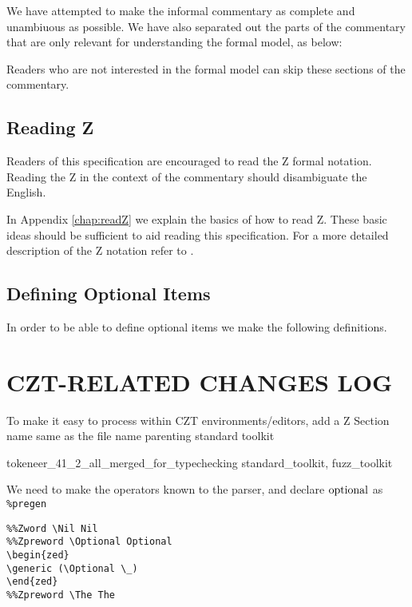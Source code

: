 We have attempted to make the informal commentary as complete and
unambiuous as possible. We have also separated out the parts of the
commentary that are only relevant for understanding the formal model,
as below:
\begin{Zcomment}
\item
Readers who are not interested in the formal model can skip these
sections of the commentary.
\end{Zcomment}

\subsection{Reading Z}
Readers of this specification are encouraged to read the Z formal notation. 
Reading the Z in the context of the commentary should disambiguate the
English. 

In Appendix \ref{chap:readZ} we explain the basics of how to read Z. 
These basic ideas should be sufficient to aid reading this
specification. For a more detailed description of the Z notation refer
to \cite{Spivey}.

\subsection{Defining Optional Items}

In order to be able to define optional items we make the following definitions.

\def\Nil{nil}%
\def\Optional{\mathop{\rm optional}}
\def\The{the~}%


\section{CZT-RELATED CHANGES LOG}

To make it easy to process within CZT environments/editors, add a Z Section name
same as the file name parenting standard toolkit
%
\begin{zsection}
  \SECTION tokeneer\_41\_2\_all\_merged\_for\_typechecking \parents standard\_toolkit, fuzz\_toolkit
\end{zsection}

We need to make the operators known to the parser, and declare $\Optional$ as \verb'%pregen'
\begin{verbatim}
%%Zword \Nil Nil
%%Zpreword \Optional Optional
\begin{zed}
\generic (\Optional \_)
\end{zed}
%%Zpreword \The The
\end{verbatim}

